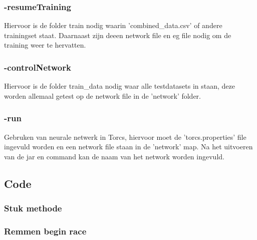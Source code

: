 \documentclass{article}
\begin{document}
\subsubsection*{-resumeTraining}
Hiervoor is de folder train nodig waarin 'combined\_data.csv' of andere trainingset staat. Daarnaast zijn deeen network file en eg file nodig om de training weer te hervatten.
\subsubsection*{-controlNetwork} 
Hiervoor is de folder train\_data nodig waar alle testdatasets in staan, deze worden allemaal getest op de network file in de 'network' folder.
\subsubsection*{-run}
Gebruken van neurale netwerk in Torcs, hiervoor moet de 'torcs.properties' file ingevuld worden en een network file staan in de 'network' map. Na het uitvoeren van de jar en command kan de naam van het network worden ingevuld.
\pagebreak
\subsection{Code}
\subsubsection*{Stuk methode}
\label{stuckmethode}

\pagebreak
\subsubsection*{Remmen begin race}
\label{breaks}

\newpage

\newpage

%

\end{document}
